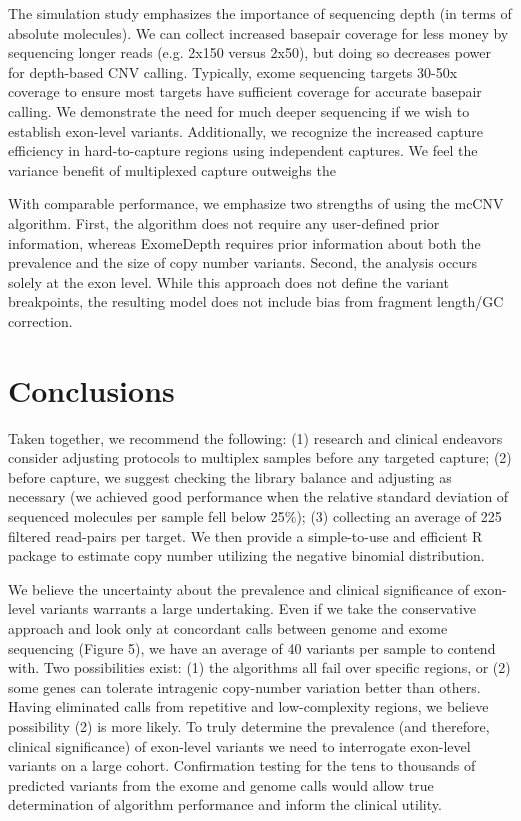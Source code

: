 \documentclass{bmcart}\usepackage[]{graphicx}\usepackage[]{color}
\begin{document}
The simulation study emphasizes the importance of sequencing depth (in terms of absolute molecules).
We can collect increased basepair coverage for less money by sequencing longer reads (e.g. 2x150 versus 2x50), but doing so decreases power for depth-based CNV calling.
Typically, exome sequencing targets 30-50x coverage to ensure most targets have sufficient coverage for accurate basepair calling.
We demonstrate the need for much deeper sequencing if we wish to establish exon-level variants.
Additionally, we recognize the increased capture efficiency in hard-to-capture regions using independent captures.
We feel the variance benefit of multiplexed capture outweighs the

With comparable performance, we emphasize two strengths of using the mcCNV algorithm.
First, the algorithm does not require any user-defined prior information, whereas ExomeDepth requires prior information about both the prevalence and the size of copy number variants.
Second, the analysis occurs solely at the exon level.
While this approach does not define the variant breakpoints, the resulting model does not include bias from fragment length/GC correction.


\section{Conclusions}

Taken together, we recommend the following:
(1) research and clinical endeavors consider adjusting protocols to multiplex samples before any targeted capture;
(2) before capture, we suggest checking the library balance and adjusting as necessary (we achieved good performance when the relative standard deviation of sequenced molecules per sample fell below 25\%);
(3) collecting an average of 225 filtered read-pairs per target.
We then provide a simple-to-use and efficient R package to estimate copy number utilizing the negative binomial distribution.

We believe the uncertainty about the prevalence and clinical significance of exon-level variants warrants a large undertaking.
Even if we take the conservative approach and look only at concordant calls between genome and exome sequencing (Figure 5), we have an average of 40 variants per sample to contend with.
Two possibilities exist: (1) the algorithms all fail over specific regions, or (2) some genes can tolerate intragenic copy-number variation better than others.
Having eliminated calls from repetitive and low-complexity regions, we believe possibility (2) is more likely.
To truly determine the prevalence (and therefore, clinical significance) of exon-level variants we need to interrogate exon-level variants on a large cohort.
Confirmation testing for the tens to thousands of predicted variants from the exome and genome calls would allow true determination of algorithm performance and inform the clinical utility.
\end{document}
